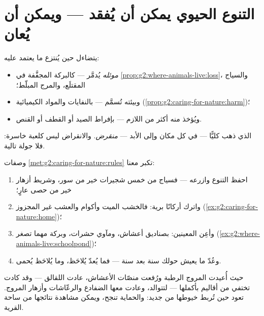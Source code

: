 \section{التنوع الحيوي يمكن أن يُفقد --- ويمكن أن يُعان}

\begin{proposition}\label{prop:g5:biodiversity:loss}
يتضاءل  حين يُنتزع ما يعتمد عليه:
\begin{itemize}
  \item \emph{موئله} يُدمَّر --- كالبركة المجفَّفة في
        \cref{prop:g2:where-animals-live:loss}، والسياج
        المقتلَع، والمرج المبلّط؛
  \item وبيئته تُسمَّم --- بالنفايات والمواد الكيميائية
        (\cref{prop:g2:caring-for-nature:harm})؛
  \item ويُؤخذ منه أكثر من اللازم --- بإفراط الصيد أو القطف أو
        القنص.
\end{itemize}
 الذي ذهب كليًّا --- في كل مكان وإلى الأبد ---
\emph{منقرض}. والانقراض ليس كلعبة خاسرة: فلا جولة
تالية.
\end{proposition}
\admitted

\begin{method}\label{met:g5:biodiversity:help}
وصفات \cref{met:g2:caring-for-nature:rules} تكبر معنا:
\begin{enumerate}
  \item احفظ التنوع وازرعه --- فسياج من خمس شجيرات خير من سور،
        وشريط أزهار خير من حصى عارٍ؛
  \item واترك أركانًا برية: فالخشب الميت وأكوام  والعشب غير
        المجزوز 
        (\cref{ex:g2:caring-for-nature:home})؛
  \item وأعِن المعينين: بصناديق أعشاش، ومآوي حشرات، وبركة مهما
        تصغر
        (\cref{ex:g2:where-animals-live:schoolpond})؛
  \item وعُدّ ما يعيش حولك سنة بعد سنة --- فما يُعدّ يُلاحَظ، وما
        يُلاحَظ يُحمى.
\end{enumerate}
\end{method}

\begin{example}\label{ex:g5:biodiversity:storks}
حيث أُعيدت المروج الرطبة ورُفعت منصّات الأعشاش، عادت اللقالق ---
وقد كادت تختفي من أقاليم بأكملها --- لتتوالد، وعادت معها الضفادع
والرعّاشات وأزهار المروج.  تعود حين تُربط خيوطها من جديد:
والحماية تنجح، ويمكن مشاهدة نتائجها من ساحة القرية.
\end{example}

